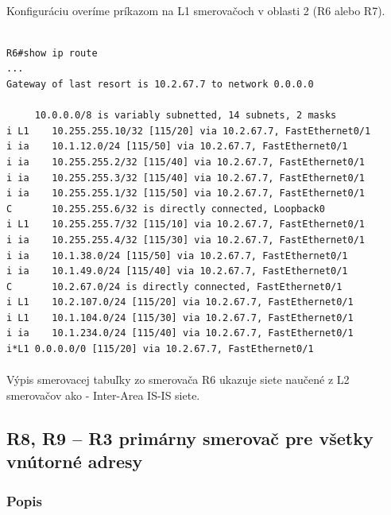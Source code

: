 \documentclass[12pt,twoside,a4paper]{report}
\begin{document}
\paragraph{}
Konfiguráciu overíme príkazom  na L1 smerovačoch v oblasti 2 (R6 alebo R7).

\noindent
{\selectfont
\begin{small}
\begin{verbatim}

R6#show ip route
...
Gateway of last resort is 10.2.67.7 to network 0.0.0.0

     10.0.0.0/8 is variably subnetted, 14 subnets, 2 masks
i L1    10.255.255.10/32 [115/20] via 10.2.67.7, FastEthernet0/1
i ia    10.1.12.0/24 [115/50] via 10.2.67.7, FastEthernet0/1
i ia    10.255.255.2/32 [115/40] via 10.2.67.7, FastEthernet0/1
i ia    10.255.255.3/32 [115/40] via 10.2.67.7, FastEthernet0/1
i ia    10.255.255.1/32 [115/50] via 10.2.67.7, FastEthernet0/1
C       10.255.255.6/32 is directly connected, Loopback0
i L1    10.255.255.7/32 [115/10] via 10.2.67.7, FastEthernet0/1
i ia    10.255.255.4/32 [115/30] via 10.2.67.7, FastEthernet0/1
i ia    10.1.38.0/24 [115/50] via 10.2.67.7, FastEthernet0/1
i ia    10.1.49.0/24 [115/40] via 10.2.67.7, FastEthernet0/1
C       10.2.67.0/24 is directly connected, FastEthernet0/1
i L1    10.2.107.0/24 [115/20] via 10.2.67.7, FastEthernet0/1
i L1    10.1.104.0/24 [115/30] via 10.2.67.7, FastEthernet0/1
i ia    10.1.234.0/24 [115/40] via 10.2.67.7, FastEthernet0/1
i*L1 0.0.0.0/0 [115/20] via 10.2.67.7, FastEthernet0/1

\end{verbatim}
\end{small}
}

\paragraph{}
Výpis smerovacej tabuľky zo smerovača R6 ukazuje siete naučené z L2 smerovačov ako  - Inter-Area IS-IS siete.





\subsection{R8, R9 – R3 primárny smerovač pre všetky vnútorné adresy}
\label{R8_primarny_smerovac}
\subsubsection{Popis}
\end{document}
